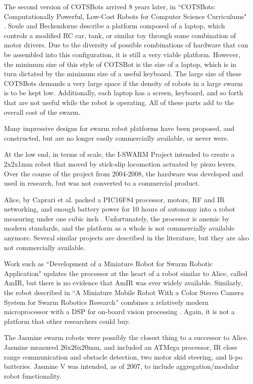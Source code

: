 \documentclass[]{article}
\begin{document}
The second version of COTSBots arrived 8 years later, in ``COTSBots: Computationally Powerful, Low-Cost Robots for Computer Science Curriculums" \cite{soule2011cotsbots}. Soule and Heckendorne describe a platform composed of a laptop, which controls a modified RC car, tank, or similar toy through some combination of motor drivers. 
Due to the diversity of possible combinations of hardware that can be assembled into this configuration, it is still a very viable platform. 
However, the minimum size of this style of COTSBot is the size of a laptop, which is in turn dictated by the minimum size of a useful keyboard. 
The large size of these COTSBots demands a very large space if the density of robots in a large swarm is to be kept low. 
Additionally, each laptop has a screen, keyboard, and so forth that are not useful while the robot is operating. 
All of these parts add to the overall cost of the swarm. 

Many impressive designs for swarm robot platforms have been proposed, and constructed, but are no longer easily commercially available, or never were. 

At the low end, in terms of scale, the I-SWARM Project intended to create a 2x2x1mm robot that moved by stick-slip locomotion actuated by piezo levers\cite{seyfried2005swarm}. 
Over the course of the project from 2004-2008, the hardware was developed and used in research, but was not converted to a commercial product. 

Alice, by Caprari et al. packed a PIC16F84 processor, motors, RF and IR networking, and enough battery power for 10 hours of autonomy into a robot measuring under one cubic inch \cite{caprari1998autonomous}. 
Unfortunately, the processor is anemic by modern standards, and the platform as a whole is not commercially available anymore. 
Several similar projects are described in the literature, but they are also not commercially available. 

Work such as ``Development of a Miniature Robot for Swarm Robotic Application" updates the processor at the heart of a robot similar to Alice, called AmIR, but there is no evidence that AmIR was ever widely available\cite{arvin2009development}.
Similarly, the robot described in ``A Miniature Mobile Robot With a Color Stereo Camera System for Swarm Robotics Research'' combines a relatively modern microprocessor with a DSP for on-board vision processing \cite{haverinen2005miniature}. 
Again, it is not a platform that other researchers could buy.

The Jasmine swarm robots were possibly the closest thing to a successor to Alice.
Jasmine measured 26x26x20mm, and included an ATMega processor, IR close range communication and obstacle detection, two motor skid steering, and li-po batteries.
Jasmine V was intended, as of 2007, to include aggregation/modular robot functionality.  
\end{document}
